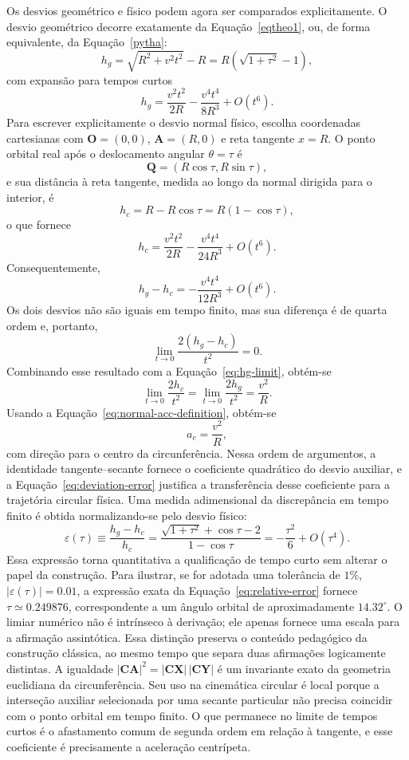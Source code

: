 \documentclass[12pt,a4paper]{article}
\newcommand{\pt}[1]{\mathbf{#1}}
\newcommand{\seglen}[1]{\lvert\mathbf{#1}\rvert}
\newcommand{\be}{\begin{equation}}
\newcommand{\ee}{\end{equation}}
\numberwithin{equation}{section}
\theoremstyle{remark}
\begin{document}
Os desvios geométrico e físico podem agora ser comparados explicitamente. O desvio geométrico decorre exatamente da Equação~\eqref{eqtheo1}, ou, de forma equivalente, da Equação~\eqref{pytha}:
\be
h_g=\sqrt{R^2+v^2t^2}-R=R\left(\sqrt{1+\tau^2}-1\right),
\label{eq:hg-exact}
\ee
com expansão para tempos curtos
\be
h_g=\frac{v^2t^2}{2R}-\frac{v^4t^4}{8R^3}+O(t^6).
\label{eq:hg-expansion}
\ee
Para escrever explicitamente o desvio normal físico, escolha coordenadas cartesianas com $\pt{O}=(0,0)$, $\pt{A}=(R,0)$ e reta tangente $x=R$. O ponto orbital real após o deslocamento angular $\theta=\tau$ é
\be
\pt{Q}=(R\cos\tau,R\sin\tau),
\label{eq:Q-coordinate}
\ee
e sua distância à reta tangente, medida ao longo da normal dirigida para o interior, é
\be
h_c=R-R\cos\tau=R(1-\cos\tau),
\label{eq:hc-exact}
\ee
o que fornece
\be
h_c=\frac{v^2t^2}{2R}-\frac{v^4t^4}{24R^3}+O(t^6).
\label{eq:hc-expansion}
\ee
Consequentemente,
\be
h_g-h_c=-\frac{v^4t^4}{12R^3}+O(t^6).
\label{eq:deviation-error}
\ee
Os dois desvios não são iguais em tempo finito, mas sua diferença é de quarta ordem e, portanto,
\be
\lim_{t\to0}\frac{2(h_g-h_c)}{t^2}=0.
\ee
Combinando esse resultado com a Equação~\eqref{eq:hg-limit}, obtém-se
\be
\lim_{t\to0}\frac{2h_c}{t^2}=\lim_{t\to0}\frac{2h_g}{t^2}=\frac{v^2}{R}.
\label{eq:local-equivalence}
\ee
Usando a Equação~\eqref{eq:normal-acc-definition}, obtém-se
\be
a_c=\frac{v^2}{R},
\ee
com direção para o centro da circunferência. Nessa ordem de argumentos, a identidade tangente--secante fornece o coeficiente quadrático do desvio auxiliar, e a Equação~\eqref{eq:deviation-error} justifica a transferência desse coeficiente para a trajetória circular física. Uma medida adimensional da discrepância em tempo finito é obtida normalizando-se pelo desvio físico:
\be
\varepsilon(\tau)\equiv\frac{h_g-h_c}{h_c}=\frac{\sqrt{1+\tau^2}+\cos\tau-2}{1-\cos\tau}=-\frac{\tau^2}{6}+O(\tau^4).
\label{eq:relative-error}
\ee
Essa expressão torna quantitativa a qualificação de tempo curto sem alterar o papel da construção. Para ilustrar, se for adotada uma tolerância de $1\%$, $|\varepsilon(\tau)|=0.01$, a expressão exata da Equação~\eqref{eq:relative-error} fornece $\tau\simeq0.249876$, correspondente a um ângulo orbital de aproximadamente $14.32^{\circ}$. O limiar numérico não é intrínseco à derivação; ele apenas fornece uma escala para a afirmação assintótica. Essa distinção preserva o conteúdo pedagógico da construção clássica, ao mesmo tempo que separa duas afirmações logicamente distintas. A igualdade $\seglen{CA}^{2}=\seglen{CX}\,\seglen{CY}$ é um invariante exato da geometria euclidiana da circunferência. Seu uso na cinemática circular é local porque a interseção auxiliar selecionada por uma secante particular não precisa coincidir com o ponto orbital em tempo finito. O que permanece no limite de tempos curtos é o afastamento comum de segunda ordem em relação à tangente, e esse coeficiente é precisamente a aceleração centrípeta.
\end{document}
